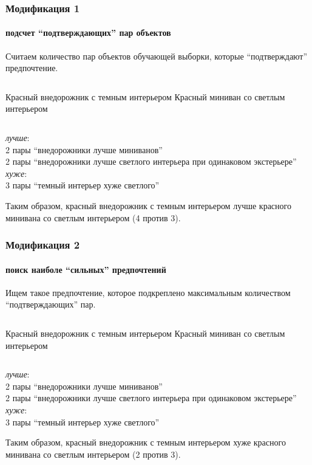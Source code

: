 \documentclass{beamer}
\theoremstyle{definition}
\begin{document}
	\begin{frame}
		\frametitle{Модификация 1}
		\framesubtitle{подсчет ``подтверждающих'' пар объектов}
		Считаем количество пар объектов обучающей выборки, которые ``подтверждают'' предпочтение. 
		\vspace{1.4em}
		\begin{columns}[c] 
			Красный внедорожник с темным интерьером
			Красный миниван со светлым интерьером
		\end{columns}
		\begin{center}
			\vspace{0.5em}
			\emph{лучше}: \\ 
			2 пары ``внедорожники лучше миниванов'' \\
			2 пары ``внедорожники лучше светлого интерьера при одинаковом экстерьере'' \\
			\vspace{1em}
			\emph{хуже}: \\
			3 пары ``темный интерьер хуже светлого''
		\end{center}
		
		\vspace{1.5em}
		Таким образом, красный внедорожник с темным интерьером {\color{green} лучше} красного минивана со светлым интерьером (4 против 3).
	\end{frame}
	
	\begin{frame}
		\frametitle{Модификация 2}
		\framesubtitle{поиск наиболе ``сильных'' предпочтений}
		Ищем такое предпочтение, которое подкреплено максимальным количеством ``подтверждающих'' пар.
		\vspace{1.4em}
		\begin{columns}[c] 
			\column{.5\textwidth} 
			Красный внедорожник с темным интерьером
			\column{.5\textwidth}
			Красный миниван со светлым интерьером
		\end{columns}
		\begin{center}
			\vspace{0.5em}
			\emph{лучше}: \\ 
			2 пары ``внедорожники лучше миниванов'' \\
			2 пары ``внедорожники лучше светлого интерьера при одинаковом экстерьере'' \\
			\vspace{1em}
			\emph{хуже}: \\
			3 пары ``темный интерьер хуже светлого''
		\end{center}
		
		\vspace{1.5em}
		Таким образом, красный внедорожник с темным интерьером {\color{red} хуже} красного минивана со светлым интерьером (2 против 3).
	\end{frame}
	
\end{document}
